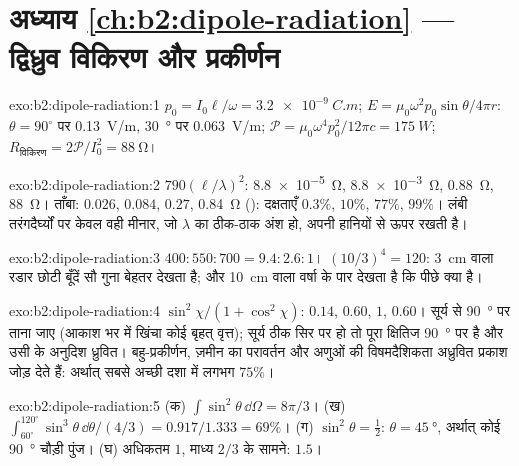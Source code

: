 \section*{अध्याय \ref{ch:b2:dipole-radiation} --- द्विध्रुव विकिरण और प्रकीर्णन}

\begin{solution}{exo:b2:dipole-radiation:1}
$p_0 = I_0\ell/\omega = \qty{3.2e-9}{C.m}$; $E = \mu_0\omega^2p_0\sin\theta/4\pi r$: $\theta = 90^\circ$ पर
\qty{0.13}{V/m}, \qty{30}{\degree} पर \qty{0.063}{V/m}; $\mathcal P = \mu_0\omega^4p_0^2/12\pi c =
\qty{175}{W}$; $R_{\text{विकिरण}} = 2\mathcal P/I_0^2 = \qty{88}{\ohm}$।
\end{solution}

\begin{solution}{exo:b2:dipole-radiation:2}
$790(\ell/\lambda)^2$: \qty{8.8e-5}{\ohm}, \qty{8.8e-3}{\ohm}, \qty{0.88}{\ohm}, \qty{88}{\ohm}। ताँबा:
$0.026$, $0.084$, $0.27$, \qty{0.84}{\ohm} (): दक्षताएँ $0.3\%$, $10\%$,
$77\%$, $99\%$। लंबी तरंगदैर्घ्यों पर केवल वही मीनार, जो
$\lambda$ का ठीक-ठाक अंश हो, अपनी हानियों से ऊपर  रखती है।
\end{solution}

\begin{solution}{exo:b2:dipole-radiation:3}
$400 : 550 : 700 = 9.4 : 2.6 : 1$। $(10/3)^4 = 120$: \qty{3}{cm} वाला रडार
छोटी बूँदें सौ गुना बेहतर देखता है; और \qty{10}{cm} वाला वर्षा के
पार देखता है कि पीछे क्या है।
\end{solution}

\begin{solution}{exo:b2:dipole-radiation:4}
$\sin^2\chi/(1 + \cos^2\chi)$: $0.14$, $0.60$, $1$, $0.60$। सूर्य से \qty{90}{\degree} पर
ताना जाए (आकाश भर में खिंचा कोई बृहत् वृत्त); सूर्य ठीक सिर पर हो तो पूरा
क्षितिज \qty{90}{\degree} पर है और उसी के अनुदिश ध्रुवित। बहु-प्रकीर्णन,
ज़मीन का परावर्तन और अणुओं की विषमदैशिकता अध्रुवित
प्रकाश जोड़ देते हैं: अर्थात् सबसे अच्छी दशा में लगभग $75\%$।
\end{solution}

\begin{solution}{exo:b2:dipole-radiation:5}
(क) $\int\sin^2\theta\,\dd\Omega = 8\pi/3$। (ख) $\int_{60^\circ}^{120^\circ}\sin^3\theta\,\dd\theta/
(4/3) = 0.917/1.333 = 69\%$। (ग) $\sin^2\theta = \tfrac12$: $\theta = \qty{45}{\degree}$, अर्थात् कोई
\qty{90}{\degree} चौड़ी पुंज। (घ) अधिकतम $1$, माध्य $2/3$ के सामने: $1.5$।
\end{solution}

